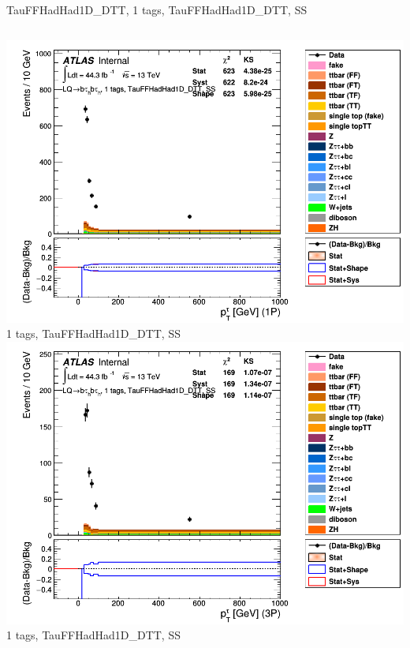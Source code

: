 \begin{frame}{TauFFHadHad1D\_DTT, 1 tags, TauFFHadHad1D\_DTT, SS}
  \begin{columns}[c]
    \centering\includegraphics[width=\textwidth]{C_1tag2pjet_0ptv_SS_TauPt1P}\\
    1 tags, TauFFHadHad1D\_DTT, SS
    \centering\includegraphics[width=\textwidth]{C_1tag2pjet_0ptv_SS_TauPt3P}\\
    1 tags, TauFFHadHad1D\_DTT, SS
  \end{columns}
  \begin{columns}[c]

\end{columns}
\end{frame}
